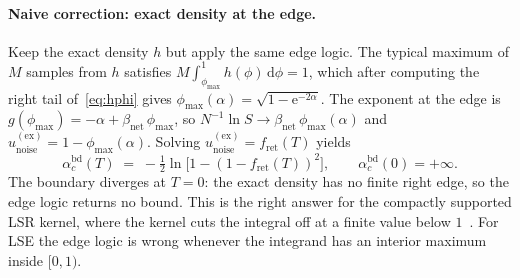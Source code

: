 \documentclass[11pt]{article}
\newcommand{\e}{{\mathrm{e}}}
\newcommand{\dd}{{\mathrm{d}}}
\newcommand{\Bnet}{\beta_{\mathrm{net}}}
\newcommand{\fret}{f_{\mathrm{ret}}}
\newcommand{\acBd}{\alpha_c^{\mathrm{bd}}}
\begin{document}
\paragraph{Naive correction: exact density at the edge.}
Keep the exact density $h$ but apply the same edge logic.  The typical
maximum of $M$ samples from $h$ satisfies
$M\int_{\phi_{\max}}^{1} h(\phi)\,\dd\phi = 1$, which after computing the right
tail of~\eqref{eq:hphi} gives
$\phi_{\max}(\alpha) = \sqrt{1 - \e^{-2\alpha}}$.  The exponent at
the edge is $g(\phi_{\max}) = -\alpha + \Bnet\,\phi_{\max}$, so
$N^{-1}\ln S \to \Bnet\,\phi_{\max}(\alpha)$ and
$u_{\mathrm{noise}}^{(\mathrm{ex})} = 1 - \phi_{\max}(\alpha)$.
Solving $u_{\mathrm{noise}}^{(\mathrm{ex})} = \fret(T)$ yields
\begin{equation}
\acBd(T) \;=\; -\tfrac12 \ln\!\bigl[1 - (1 - \fret(T))^2\bigr],
\qquad \acBd(0) = +\infty.
\label{eq:acbd}
\end{equation}
The boundary diverges at $T = 0$: the exact density has no finite right
edge, so the edge logic returns no bound.  This is the right answer for
the compactly supported LSR kernel, where the kernel cuts the integral
off at a finite value below $1$~\citep{petrova2026metastable}.  For LSE
the edge logic is wrong whenever the integrand has an interior maximum
inside $[0, 1)$.
\end{document}
